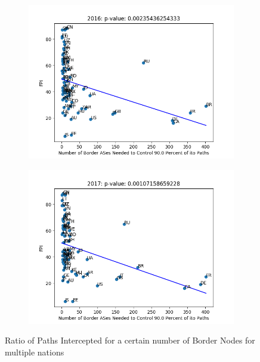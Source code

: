 \documentclass{article}
\begin{document}
\begin{multicols}{2}
\begin{figure}
\begin{subfigure}[b]{0.4\linewidth}
		\includegraphics[width=\linewidth]{fotn2016}
	\end{subfigure}
	\begin{subfigure}[b]{0.4\linewidth}
		\includegraphics[width=\linewidth]{fotn2017}
	\end{subfigure}


	\caption{Ratio of Paths Intercepted for a certain number of Border Nodes for multiple nations}\label{fig:fotn}
\end{figure}


\end{multicols}
\end{document}
